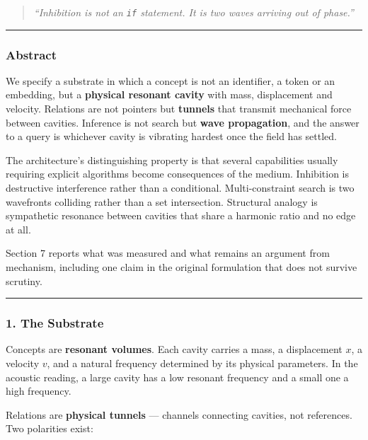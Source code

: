 \documentclass[
  11pt,
  a4paper,
]{article}
\begin{document}
\begin{quote}
\emph{``Inhibition is not an \texttt{if} statement. It is two waves
arriving out of phase.''}
\end{quote}

\begin{center}\rule{0.5\linewidth}{0.5pt}\end{center}

\subsubsection{Abstract}\label{abstract}

We specify a substrate in which a concept is not an identifier, a token
or an embedding, but a \textbf{physical resonant cavity} with mass,
displacement and velocity. Relations are not pointers but
\textbf{tunnels} that transmit mechanical force between cavities.
Inference is not search but \textbf{wave propagation}, and the answer to
a query is whichever cavity is vibrating hardest once the field has
settled.

The architecture's distinguishing property is that several capabilities
usually requiring explicit algorithms become consequences of the medium.
Inhibition is destructive interference rather than a conditional.
Multi-constraint search is two wavefronts colliding rather than a set
intersection. Structural analogy is sympathetic resonance between
cavities that share a harmonic ratio and no edge at all.

Section 7 reports what was measured and what remains an argument from
mechanism, including one claim in the original formulation that does not
survive scrutiny.

\begin{center}\rule{0.5\linewidth}{0.5pt}\end{center}

\subsubsection{1. The Substrate}\label{the-substrate}

Concepts are \textbf{resonant volumes}. Each cavity carries a mass, a
displacement \(x\), a velocity \(v\), and a natural frequency determined
by its physical parameters. In the acoustic reading, a large cavity has
a low resonant frequency and a small one a high frequency.

Relations are \textbf{physical tunnels} --- channels connecting
cavities, not references. Two polarities exist:
\end{document}
